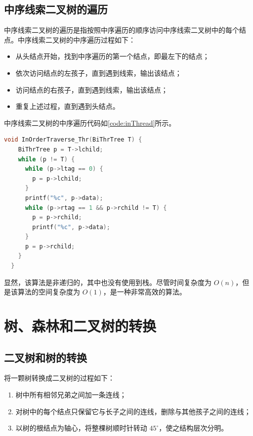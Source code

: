 \documentclass[lang=cn,newtx,10pt,scheme=chinese]{../elegantbook}
\begin{document}
\subsection{中序线索二叉树的遍历}

中序线索二叉树的遍历是指按照中序遍历的顺序访问中序线索二叉树中的每个结点。中序线索二叉树的中序遍历过程如下：

\begin{itemize}
  \item 从头结点开始，找到中序遍历的第一个结点，即最左下的结点；
  \item 依次访问结点的左孩子，直到遇到线索，输出该结点；
  \item 访问结点的右孩子，直到遇到线索，输出该结点；
  \item 重复上述过程，直到遇到头结点。
  \end{itemize}

中序线索二叉树的中序遍历代码如\ref{code:inThread}所示。

\begin{lstlisting}[language=C++, caption={中序线索二叉树的中序遍历}, label={code:inThread}]
  void InOrderTraverse_Thr(BiThrTree T) {
    BiThrTree p = T->lchild;
    while (p != T) {
      while (p->ltag == 0) {
        p = p->lchild;
      }
      printf("%c", p->data);
      while (p->rtag == 1 && p->rchild != T) {
        p = p->rchild;
        printf("%c", p->data);
      }
      p = p->rchild;
    }
  }

\end{lstlisting}

显然，该算法是非递归的，其中也没有使用到栈。尽管时间复杂度为 $O(n)$，但是该算法的空间复杂度为 $O(1)$，是一种非常高效的算法。
\section{树、森林和二叉树的转换}

\subsection{二叉树和树的转换}

将一颗树转换成二叉树的过程如下：
\begin{enumerate}
  \item 树中所有相邻兄弟之间加一条连线；
  \item 对树中的每个结点只保留它与长子之间的连线，删除与其他孩子之间的连线；
  \item 以树的根结点为轴心，将整棵树顺时针转动 $45^\circ$，使之结构层次分明。
\end{enumerate}
\end{document}
